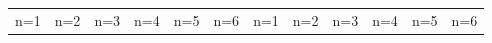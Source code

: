 \documentclass[letterpaper]{article} %
\begin{document}
\begin{figure}[!htbp]
\centering
\vspace{-5pt}
\footnotesize 
\begin{tabular}{cccccccccccc}
\multicolumn{1}{c}{n=1} \hspace{-12pt} &  
\multicolumn{1}{c}{n=2} \hspace{-12pt} & 
\multicolumn{1}{c}{n=3} \hspace{-12pt} & 
\multicolumn{1}{c}{n=4} \hspace{-12pt} & 
\multicolumn{1}{c}{n=5} \hspace{-12pt} & 
\multicolumn{1}{c}{n=6} \hspace{-12pt} & 
\multicolumn{1}{c}{n=1} \hspace{-12pt} &  
\multicolumn{1}{c}{n=2} \hspace{-12pt} & 
\multicolumn{1}{c}{n=3} \hspace{-12pt} & 
\multicolumn{1}{c}{n=4} \hspace{-12pt} & 
\multicolumn{1}{c}{n=5} \hspace{-12pt} & 
\multicolumn{1}{c}{n=6} \\ 


\end{tabular}
\end{figure}
\end{document}
